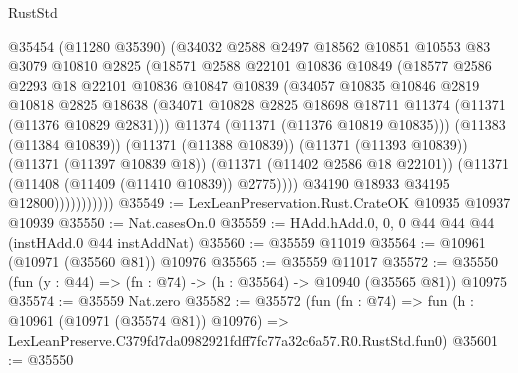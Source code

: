 \begin{lexlean}{RustStd}
\begin{coremodule}
                        @35454
                        (@11280 @35390)
                        (@34032
                          @2588
                          @2497
                          @18562
                          @10851
                          @10553
                          @83
                          @3079
                          @10810
                          @2825
                          (@18571
                            @2588
                            @22101
                            @10836
                            @10849
                            (@18577
                              @2586
                              @2293
                              @18
                              @22101
                              @10836
                              @10847
                              @10839
                              (@34057
                                @10835
                                @10846
                                @2819
                                @10818
                                @2825
                                @18638
                                (@34071
                                  @10828
                                  @2825
                                  @18698
                                  @18711
                                  @11374
                                  (@11371 (@11376 @10829 @2831)))
                                @11374
                                (@11371 (@11376 @10819 @10835)))
                              (@11383 (@11384 @10839))
                              (@11371 (@11388 @10839))
                              (@11371 (@11393 @10839))
                              (@11371 (@11397 @10839 @18))
                              (@11371 (@11402 @2586 @18 @22101))
                              (@11371 (@11408 (@11409 (@11410 @10839)) @2775))))
                          @34190
                          @18933
                          @34195
                          @12800)))))))))))
@35549 := LexLeanPreservation.Rust.CrateOK @10935 @10937 @10939
@35550 := Nat.casesOn.{0}
@35559 := HAdd.hAdd.{0, 0, 0} @44 @44 @44 (instHAdd.{0} @44 instAddNat)
@35560 := @35559 @11019
@35564 := @10961 (@10971 (@35560 @81)) @10976
@35565 := @35559 @11017
@35572 := @35550 (fun (y : @44) => (fn : @74) -> (h : @35564) -> @10940 (@35565 @81)) @10975
@35574 := @35559 Nat.zero
@35582 := @35572
    (fun (fn : @74) =>
    fun (h : @10961 (@10971 (@35574 @81)) @10976) =>
    LexLeanPreserve.C379fd7da0982921fdff7fc77a32c6a57.R0.RustStd.fun0)
@35601 := @35550

\end{coremodule}
\end{lexlean}
